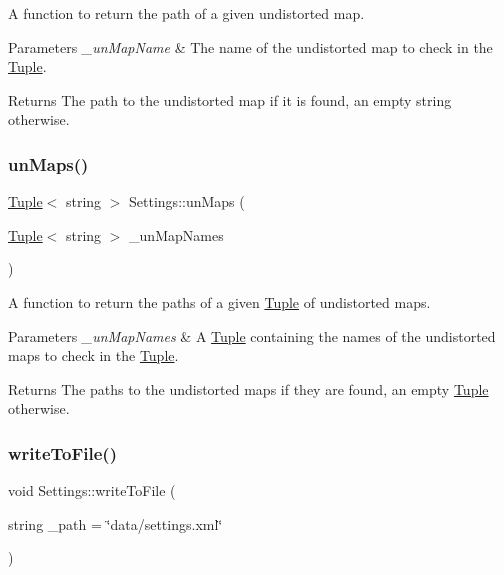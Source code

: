 A function to return the path of a given undistorted map. 


\begin{DoxyParams}{Parameters}
{\em \+\_\+un\+Map\+Name} & The name of the undistorted map to check in the \mbox{\hyperlink{class_tuple}{Tuple}}. \\
\hline
\end{DoxyParams}
\begin{DoxyReturn}{Returns}
The path to the undistorted map if it is found, an empty string otherwise. 
\end{DoxyReturn}
\mbox{\label{class_settings_aa89550d142cb4101faf35af214f4edff}} 
\subsubsection{\texorpdfstring{unMaps()}{unMaps()}\hspace{0.1cm}{\footnotesize\ttfamily [4/4]}}
{\footnotesize\ttfamily \mbox{\hyperlink{class_tuple}{Tuple}}$<$ string $>$ Settings\+::un\+Maps (\begin{DoxyParamCaption}\item[{\mbox{\hyperlink{class_tuple}{Tuple}}$<$ string $>$}]{\+\_\+un\+Map\+Names }\end{DoxyParamCaption})}



A function to return the paths of a given \mbox{\hyperlink{class_tuple}{Tuple}} of undistorted maps. 


\begin{DoxyParams}{Parameters}
{\em \+\_\+un\+Map\+Names} & A \mbox{\hyperlink{class_tuple}{Tuple}} containing the names of the undistorted maps to check in the \mbox{\hyperlink{class_tuple}{Tuple}}. \\
\hline
\end{DoxyParams}
\begin{DoxyReturn}{Returns}
The paths to the undistorted maps if they are found, an empty \mbox{\hyperlink{class_tuple}{Tuple}} otherwise. 
\end{DoxyReturn}
\mbox{\label{class_settings_a1afc50e91691fae24114ba5e248dfd87}} 
\subsubsection{\texorpdfstring{writeToFile()}{writeToFile()}}
{\footnotesize\ttfamily void Settings\+::write\+To\+File (\begin{DoxyParamCaption}\item[{string}]{\+\_\+path = {\ttfamily \char`\"{}data/settings.xml\char`\"{}} }\end{DoxyParamCaption})}



